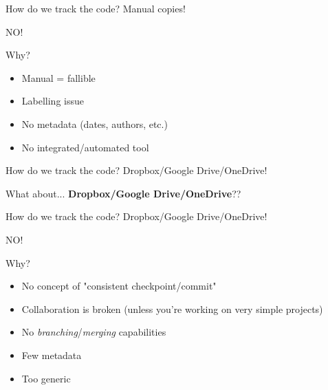 \begin{frame}[fragile]{How do we track the code? Manual copies!}

\begin{center}
\Huge NO!
\end{center}

Why?
\begin{itemize}
  \item Manual = fallible
  \item Labelling issue
  \item No metadata (dates, authors, etc.)
  \item No integrated/automated tool
\end{itemize}

\end{frame}

\begin{frame}[fragile]{How do we track the code? Dropbox/Google Drive/OneDrive!}

What about... \textbf{Dropbox/Google Drive/OneDrive}??

\end{frame}

\begin{frame}[fragile]{How do we track the code? Dropbox/Google Drive/OneDrive!}

\begin{center}
\Huge NO!
\end{center}

Why?
\begin{itemize}
  \item No concept of "consistent checkpoint/commit"
  \item Collaboration is broken (unless you're working on very simple projects)
  \item No \textit{branching}/\textit{merging} capabilities
  \item Few metadata
  \item Too generic
\end{itemize}

\end{frame}

